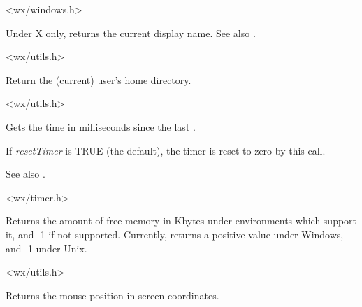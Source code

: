 
<wx/windows.h>

\label{wxgetdisplayname}


Under X only, returns the current display name. See also .


<wx/utils.h>

\label{wxgethomedir}


Return the (current) user's home directory.




<wx/utils.h>

\label{wxgetelapsedtime}


Gets the time in milliseconds since the last .

If {\it resetTimer} is TRUE (the default), the timer is reset to zero
by this call.

See also .


<wx/timer.h>

\label{wxgetfreememory}


Returns the amount of free memory in Kbytes under environments which
support it, and -1 if not supported. Currently, returns a positive value
under Windows, and -1 under Unix.


<wx/utils.h>



Returns the mouse position in screen coordinates.


